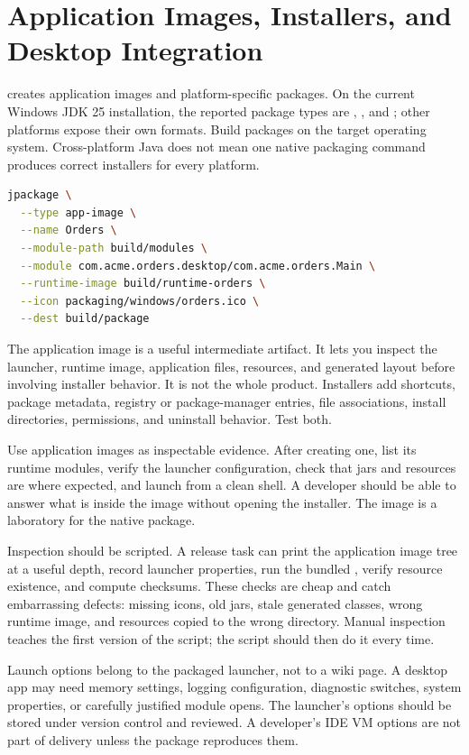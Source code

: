 \section{Application Images, Installers, and Desktop Integration}

 creates application images and platform-specific packages. On the current Windows JDK 25 installation, the reported package types are , , and ; other platforms expose their own formats. Build packages on the target operating system. Cross-platform Java does not mean one native packaging command produces correct installers for every platform.

\begin{lstlisting}[language=sh,caption={Creating an application image from a modular app.}]
jpackage \
  --type app-image \
  --name Orders \
  --module-path build/modules \
  --module com.acme.orders.desktop/com.acme.orders.Main \
  --runtime-image build/runtime-orders \
  --icon packaging/windows/orders.ico \
  --dest build/package
\end{lstlisting}

The application image is a useful intermediate artifact. It lets you inspect the launcher, runtime image, application files, resources, and generated layout before involving installer behavior. It is not the whole product. Installers add shortcuts, package metadata, registry or package-manager entries, file associations, install directories, permissions, and uninstall behavior. Test both.

Use application images as inspectable evidence. After creating one, list its runtime modules, verify the launcher configuration, check that jars and resources are where expected, and launch from a clean shell. A developer should be able to answer what is inside the image without opening the installer. The image is a laboratory for the native package.

Inspection should be scripted. A release task can print the application image tree at a useful depth, record launcher properties, run the bundled , verify resource existence, and compute checksums. These checks are cheap and catch embarrassing defects: missing icons, old jars, stale generated classes, wrong runtime image, and resources copied to the wrong directory. Manual inspection teaches the first version of the script; the script should then do it every time.

Launch options belong to the packaged launcher, not to a wiki page. A desktop app may need memory settings, logging configuration, diagnostic switches, system properties, or carefully justified module opens. The launcher's options should be stored under version control and reviewed. A developer's IDE VM options are not part of delivery unless the package reproduces them.

